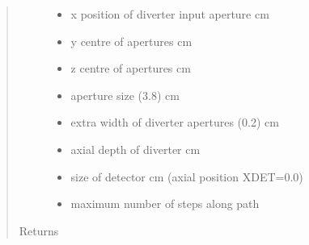 \documentclass[letterpaper,10pt,english]{sphinxmanual}
\begin{document}
\begin{fulllineitems}
\begin{quote}
\begin{description}
\begin{itemize}
\item {} 
 \textendash{} x position of diverter input aperture cm

\item {} 
 \textendash{} y centre of apertures cm

\item {} 
 \textendash{} z centre of apertures cm

\item {} 
 \textendash{} aperture size (3.8) cm

\item {} 
 \textendash{} extra width of diverter apertures (0.2) cm

\item {} 
 \textendash{} axial depth of diverter cm

\item {} 
 \textendash{} size of detector cm (axial position XDET=0.0)

\item {} 
 \textendash{} maximum number of steps along path

\end{itemize}

\item[{Returns}] \leavevmode


\end{description}
\end{quote}
\end{fulllineitems}
\end{document}
